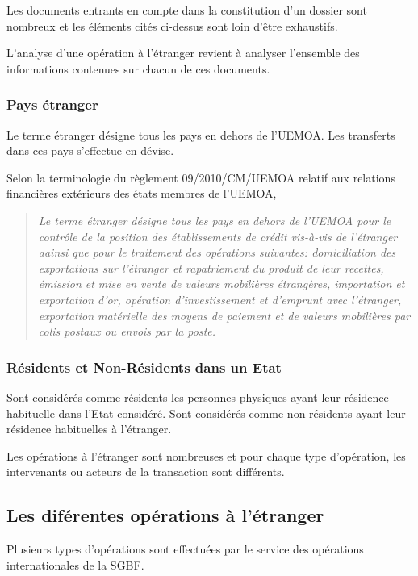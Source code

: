    Les documents entrants en compte dans la constitution d'un dossier sont 
   nombreux et les éléments cités ci-dessus sont loin d'être exhaustifs.  

L'analyse d'une opération à l'étranger revient à analyser l'ensemble des 
informations contenues sur chacun de ces documents.

\subsubsection{Pays étranger}

Le terme étranger désigne tous les pays en dehors de l’UEMOA. Les 
transferts dans ces pays s'effectue en dévise.

Selon la terminologie du règlement 09/2010/CM/UEMOA relatif aux relations 
financières extérieurs des états membres de l'UEMOA, 
\begin{quote}
 \textit{Le terme étranger désigne  tous les pays en dehors de l'UEMOA pour le 
 contrôle de la position des établissements de crédit vis-à-vis de 
 l'étranger aainsi que pour le traitement des opérations suivantes: 
 domiciliation des exportations sur l'étranger et rapatriement du produit 
 de leur recettes, émission et mise en vente de valeurs mobilières 
 étrangères, importation et exportation d'or, opération d'investissement
 et d'emprunt avec l'étranger, exportation matérielle des moyens de 
 paiement et de valeurs mobilières par colis postaux ou envois par la 
 poste.}
\end{quote}

\subsubsection{Résidents et Non-Résidents dans un Etat}

Sont considérés comme résidents les personnes physiques ayant leur résidence
habituelle dans l'Etat considéré. Sont considérés comme non-résidents ayant leur
résidence habituelles à l'étranger.


Les opérations à l'étranger sont nombreuses et pour chaque type d'opération, les 
intervenants ou acteurs de la transaction sont différents.

\subsection{ Les diférentes opérations à l'étranger}

Plusieurs types d'opérations sont effectuées par le service des opérations 
internationales de la SGBF.

